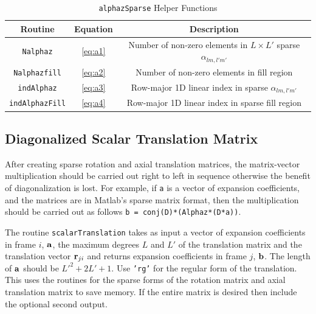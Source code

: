 \begin{table}[htbp]
\caption{\texttt{alphazSparse} Helper Functions}
\begin{center}
\begin{tabular}{|c|c|c|}
\hline
Routine & Equation & Description \\
\hline
\texttt{Nalphaz} &   \eqref{eq:a1} & Number of non-zero elements in $L \times L'$ sparse $\alpha_{lm,l'm'}$ \\
\hline
\texttt{Nalphazfill} &  \eqref{eq:a2} & Number of non-zero elements in fill region \\
\hline
\texttt{indAlphaz} &   \eqref{eq:a3} & Row-major 1D linear index in sparse $\alpha_{lm,l'm'}$ \\
\hline
\texttt{indAlphazFill} &  \eqref{eq:a4} & Row-major 1D linear index in sparse fill region \\ 
\hline
\end{tabular}
\end{center}
\label{sparsetranshelp}
\end{table}%


{\footnotesize
{}
}

{\footnotesize
{}
}

{\footnotesize
{}
}

{\footnotesize
{}
}

{\footnotesize
{}
}


\clearpage
\subsection{Diagonalized Scalar Translation Matrix}

After creating sparse rotation and axial translation matrices, the matrix-vector multiplication should be carried out right to left in sequence otherwise the benefit of diagonalization is lost. For example, if \texttt{a} is a vector of expansion coefficients, and the matrices are in Matlab's sparse matrix format, then the multiplication should be carried out as follows \texttt{b = conj(D)*(Alphaz*(D*a))}.

The routine \texttt{scalarTranslation} takes as input a vector of expansion coefficients in frame $i$, $\mathbf{a}$, the maximum degrees $L$ and $L'$ of the translation matrix and the translation vector $\mathbf{r}_{ji}$ and returns expansion coefficients in frame $j$, $\mathbf{b}$. The length of $\mathbf{a}$ should be $L'^2 + 2L' + 1$.  Use \texttt{'rg'} for the regular form of the translation.  This uses the routines for the sparse forms of the rotation matrix and axial translation matrix to save memory. If the entire matrix is desired then include the optional second output. 


